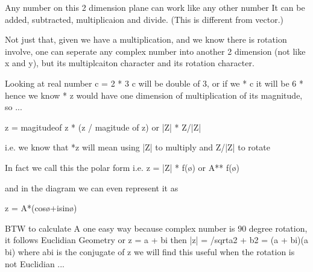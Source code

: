 \documentclass[letterpaper,10pt,english]{jupyterBook}
\begin{document}
\begin{sphinxVerbatim}[commandchars=\\\{\}]
Any number on this 2 dimension plane can work like any other number
It can be added, subtracted, multiplicaion and divide.  (This is different from vector.)

Not just that, given we have a multiplication, and we know there is rotation involve, 
one can seperate any complex number into another 2 dimension (not like x and y), 
but its multiplcaiton character and its rotation character.

Looking at real number
c = 2 * 3 
c will be double of 3, 
or if we * c it will be 6 *
hence we know * z would have one dimension of multiplication of its magnitude, so ...

z = magitudeof z * (z / magitude of z) 
or |Z| * Z/|Z| 

i.e. we know that 
*z will mean using |Z| to multiply and Z/|Z| to rotate

In fact we call this the polar form i.e. z = |Z| * f(ø) or A** f(ø)

\PYGZhy{}\PYGZhy{}\PYGZgt{} and in the diagram we can even represent it as

z = A*(cosø+isinø)

BTW to calculate A one easy way because complex number is 90 degree rotation,
    it follows Euclidian Geometry or
    z = a + bi then |z| = /sqrt\PYGZob{}a\PYGZca{}2 + b\PYGZca{}2\PYGZcb{} 
      = (a + bi)(a \PYGZhy{} bi) where a\PYGZhy{}bi is the conjugate of z
    we will find this useful when the rotation is not Euclidian ...
\end{sphinxVerbatim}
\end{document}
